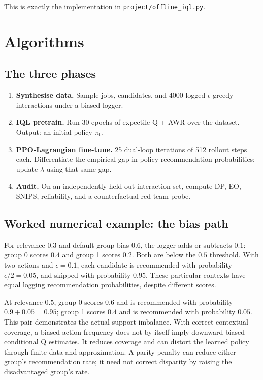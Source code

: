 \documentclass[11pt,oneside]{scrbook}
\begin{document}
This is exactly the implementation in \texttt{project/offline\_iql.py}.

\chapter{Algorithms}

\section{The three phases}

\begin{tcolorbox}[colback=mintedbg, colframe=rlgray!50, title=\textbf{Algorithm: Capstone pipeline}]
\begin{enumerate}[leftmargin=*]
  \item \textbf{Synthesise data.} Sample jobs, candidates, and 4000 logged
        $\epsilon$-greedy interactions under a biased logger.
  \item \textbf{IQL pretrain.} Run 30 epochs of expectile-Q + AWR over the
        dataset. Output: an initial policy $\pi_0$.
  \item \textbf{PPO-Lagrangian fine-tune.} 25 dual-loop iterations of 512
        rollout steps each. Differentiate the empirical gap in policy
        recommendation probabilities; update $\lambda$ using that same gap.
  \item \textbf{Audit.} On an independently held-out interaction set, compute DP, EO,
        SNIPS, reliability, and a counterfactual red-team probe.
\end{enumerate}
\end{tcolorbox}

\section{Worked numerical example: the bias path}

For relevance $0.3$ and default group bias $0.6$, the logger adds or subtracts
$0.1$: group 0 scores $0.4$ and group 1 scores $0.2$.
Both are below the $0.5$ threshold. With two actions and $\epsilon=0.1$,
each candidate is recommended with probability $\epsilon/2=0.05$, and
skipped with probability $0.95$. These particular contexts have equal
logging recommendation probabilities, despite different scores.

At relevance $0.5$, group 0 scores $0.6$ and is recommended with probability
$0.9+0.05=0.95$; group 1 scores $0.4$ and is recommended with probability
$0.05$. This pair demonstrates the actual support imbalance.
With correct contextual coverage, a biased action frequency does not by
itself imply downward-biased conditional Q estimates. It reduces coverage
and can distort the learned policy through finite data and approximation.
A parity penalty can reduce either group's recommendation rate; it need
not correct disparity by raising the disadvantaged group's rate.
\end{document}
